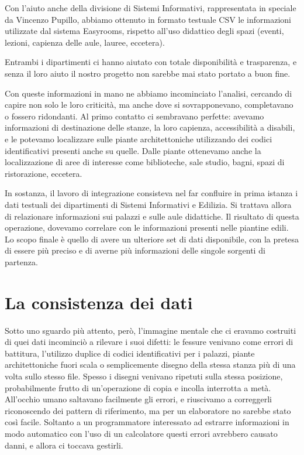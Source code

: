 \documentclass[12pt]{report}
\begin{document}
Con l'aiuto anche della divisione di Sistemi Informativi, rappresentata in speciale da Vincenzo Pupillo, abbiamo ottenuto in formato testuale CSV le informazioni utilizzate dal sistema Easyrooms, rispetto all'uso didattico degli spazi (eventi, lezioni, capienza delle aule, lauree, eccetera).

Entrambi i dipartimenti ci hanno aiutato con totale disponibilità e trasparenza, e senza il loro aiuto il nostro progetto non sarebbe mai stato portato a buon fine.

Con queste informazioni in mano ne abbiamo incominciato l'analisi, cercando di capire non solo le loro criticità, ma anche dove si sovrapponevano, completavano o fossero ridondanti. Al primo contatto ci sembravano perfette: avevamo informazioni di destinazione delle stanze, la loro capienza, accessibilità a disabili, e le potevamo localizzare sulle piante architettoniche utilizzando dei codici identificativi presenti anche su quelle. Dalle piante ottenevamo anche la localizzazione di aree di interesse come biblioteche, sale studio, bagni, spazi di ristorazione, eccetera.

In sostanza, il lavoro di integrazione consisteva nel far confluire in prima istanza i dati testuali dei dipartimenti di Sistemi Informativi e Edilizia. Si trattava allora di relazionare informazioni sui palazzi e sulle aule didattiche. Il risultato di questa operazione, dovevamo correlare con le informazioni presenti nelle piantine edili. Lo scopo finale è quello di avere un ulteriore set di dati disponibile, con la pretesa di essere più preciso e di averne più informazioni delle singole sorgenti di partenza.

\section{La consistenza dei dati}

Sotto uno sguardo più attento, però, l'immagine mentale che ci eravamo costruiti di quei dati incominciò a rilevare i suoi difetti: le fessure venivano come errori di battitura, l'utilizzo duplice di codici identificativi per i palazzi, piante architettoniche fuori scala o semplicemente disegno della stessa stanza più di una volta sullo stesso file. Spesso i disegni venivano ripetuti sulla stessa posizione, probabilmente frutto di un'operazione di copia e incolla interrotta a metà. All'occhio umano saltavano facilmente gli errori, e riuscivamo a correggerli riconoscendo dei pattern di riferimento, ma per un elaboratore no sarebbe stato così facile. Soltanto a un programmatore interessato ad estrarre informazioni in modo automatico con l'uso di un calcolatore questi errori avrebbero causato danni, e allora ci toccava gestirli.
\end{document}
